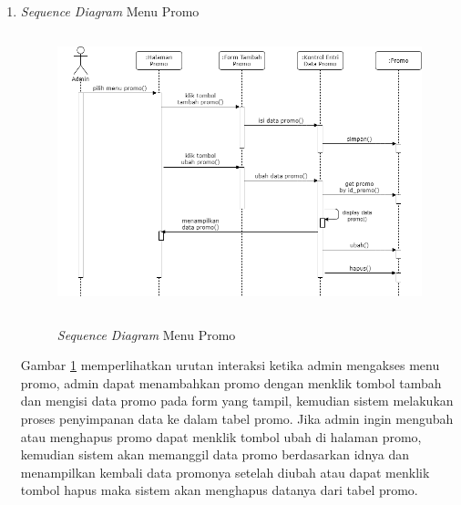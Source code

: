 \begin{enumerate}
	\item \textit{Sequence Diagram} Menu Promo
	\begin{figure}[H]
		\centering
		{\includegraphics [width = 12cm, height= 8cm]{gambar/sequence/tambah, ubah, hapus promo}}
		\caption{\textit{Sequence Diagram} Menu Promo}
		\label{seq promo}
	\end{figure}
	\par Gambar \ref*{seq promo} memperlihatkan urutan interaksi ketika admin mengakses menu promo, admin dapat menambahkan promo dengan menklik tombol tambah dan mengisi data promo pada form yang tampil, kemudian sistem melakukan proses penyimpanan data ke dalam tabel promo. Jika admin ingin mengubah atau menghapus promo dapat menklik tombol ubah di halaman promo, kemudian sistem akan memanggil data promo berdasarkan idnya dan menampilkan kembali data promonya setelah diubah atau dapat menklik tombol hapus maka sistem akan menghapus datanya dari tabel promo.


\end{enumerate}
